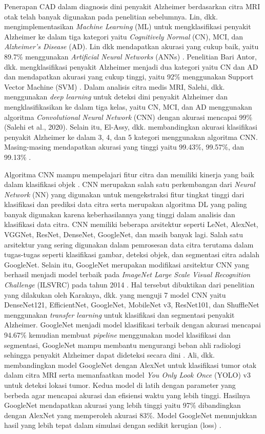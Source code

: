     Penerapan CAD dalam diagnosis dini penyakit Alzheimer berdasarkan citra MRI otak telah banyak digunakan pada penelitian sebelumnya. Lin, dkk. mengimplementasikan \textit{Machine Learning} (ML) untuk mengklasifikasi penyakit Alzheimer ke dalam tiga kategori yaitu \textit{Cognitively Normal} (CN), MCI, dan \textit{Alzheimer's Disease} (AD). Lin dkk mendapatkan akurasi yang cukup baik, yaitu 89.7\% menggunakan \textit{Artificial Neural Networks} (ANNs) \autocite{Lin2023}. Penelitian Bari Antor, dkk. mengklasifikasi penyakit Alzheimer menjadi dua kategori yaitu CN dan AD dan mendapatkan akurasi yang cukup tinggi, yaitu 92\% menggunakan Support Vector Machine (SVM) \autocite{BariAntor2021}. Dalam analisis citra medis MRI, Salehi, dkk. menggunakan \textit{deep learning} untuk deteksi dini penyakit Alzheimer dan mengklasifikasikan ke dalam tiga kelas, yaitu CN, MCI, dan AD menggunakan algoritma \textit{Convolutional Neural Network} (CNN) dengan akurasi mencapai 99\% (Salehi et al., 2020). Selain itu, El-Assy, dkk. membandingkan akurasi klasifikasi penyakit Alzheimer ke dalam 3, 4, dan 5 kategori menggunakan algoritma CNN. Masing-masing mendapatkan akurasi yang tinggi yaitu 99.43\%, 99.57\%, dan 99.13\%  \autocite{El-Assy2024}.

    Algoritma CNN mampu mempelajari fitur citra dan memiliki kinerja yang baik dalam klasifikasi objek \autocite{Ahmad2020}. CNN merupakan salah satu perkembangan dari \textit{Neural Network} (NN) yang digunakan untuk mengekstraksi fitur tingkat tinggi dari klasifikasi dan prediksi data citra serta merupakan algoritma DL yang paling banyak digunakan karena keberhasilannya yang tinggi dalam analisis dan klasifikasi data citra. CNN memiliki beberapa arsitektur seperti LeNet, AlexNet, VGGNet, ResNet, DenseNet, GoogleNet, dan masih banyak lagi. Salah satu arsitektur yang sering digunakan dalam pemrosesan data citra terutama dalam tugas-tugas seperti klasifikasi gambar, deteksi objek, dan segmentasi citra adalah GoogleNet. Selain itu, GoogleNet merupakan modifikasi arsitektur CNN yang berhasil menjadi model terbaik pada \textit{ImageNet Large Scale Visual Recognition Challenge} (ILSVRC) pada tahun 2014 \autocite{Saidah2022}. Hal tersebut dibuktikan dari penelitian yang dilakukan oleh Karakaya, dkk. yang menguji 7 model CNN yaitu DenseNet121, EfficientNet, GoogleNet, MobileNet v3, ResNet101, dan ShuffleNet menggunakan \textit{transfer learning} untuk klasifikasi dan segmentasi penyakit Alzheimer. GoogleNet menjadi model klasifikasi terbaik dengan akurasi mencapai 94.67\% kemudian membuat \textit{pipeline} menggunakan model klasifikasi dan segmentasi, GoogleNet mampu membantu mengurangi beban ahli radiologi sehingga penyakit Alzheimer dapat dideteksi secara dini \autocite{Karakaya2022}. Ali, dkk. membandingkan model GoogleNet dengan AlexNet untuk klasifikasi tumor otak dalam citra MRI serta memanfaatkan model \textit{You Only Look Once} (YOLO) v3 untuk deteksi lokasi tumor. Kedua model di latih dengan parameter yang berbeda agar mencapai akurasi dan efisiensi waktu yang lebih tinggi. Hasilnya GoogleNet mendapatkan akurasi yang lebih tinggi yaitu 97\% dibandingkan dengan AlexNet yang memperoleh akurasi 83\%. Model GoogleNet menunjukkan hasil yang lebih tepat dalam simulasi dengan sedikit kerugian (loss) \autocite{Ali2022}.
    

